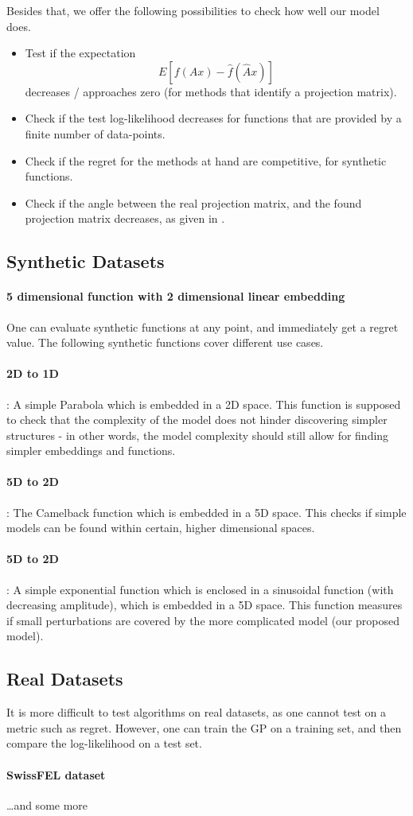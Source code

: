 Besides that, we offer the following possibilities to check how well our model does.

\begin{itemize}
\item Test if the expectation $$ E[ f(A x) - \hat{f}(\hat{A} x) ] $$ decreases / approaches zero (for methods that identify a projection matrix).
\item Check if the test log-likelihood decreases for functions that are provided by a finite number of data-points.
\item Check if the regret for the methods at hand are competitive, for synthetic functions.
\item Check if the angle between the real projection matrix, and the found projection matrix decreases, as given in \citep{AngleMeasurement}.
\end{itemize}


\subsection{Synthetic Datasets} \label{syntheticFunction}
\paragraph{5 dimensional function with 2 dimensional linear embedding}

One can evaluate synthetic functions at any point, and immediately get a regret value.
The following synthetic functions cover different use cases.

\paragraph{2D to 1D}: A simple Parabola which is embedded in a 2D space.
This function is supposed to check that the complexity of the model does not hinder discovering simpler structures - in other words, the model complexity should still allow for finding simpler embeddings and functions.
\paragraph{5D to 2D}: The Camelback function which is embedded in a 5D space.
This checks if simple models can be found within certain, higher dimensional spaces.
\paragraph{5D to 2D}: A simple exponential function which is enclosed in a sinusoidal function (with decreasing amplitude), which is embedded in a 5D space.
This function measures if small perturbations are covered by the more complicated model (our proposed model).

\subsection{Real Datasets}
It is more difficult to test algorithms on real datasets, as one cannot test on a metric such as regret.
However, one can train the GP on a training set, and then compare the log-likelihood on a test set.

\paragraph{SwissFEL dataset}
\dots and some more 


